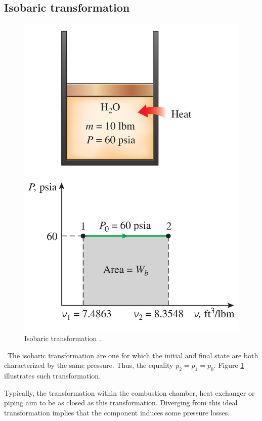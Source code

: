 \subsection{Isobaric transformation}
\begin{figure}
  \centering
  \includegraphics{isoP.png}
  \caption{Isobaric transformation \cite{2015}.}
  \label{fig:C2_5_isoB}
\end{figure}
\quad\ The isobaric transformation are one for which the initial and final state are both characterized by the same pressure. Thus, the equality \(p_2 = p_1 = p_0\). Figure \ref{fig:C2_5_isoB} illustrates such transformation.

Typically, the transformation within the combustion chamber, heat exchanger or piping aim to be as closed as this transformation. Diverging from this ideal transformation implies that the component induces some pressure losses.

